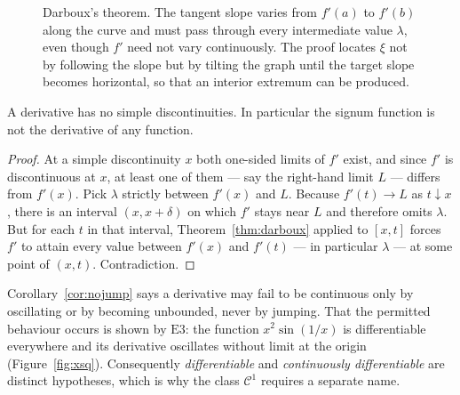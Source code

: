\begin{figure}[htbp]
\centering
{}
\caption{Darboux's theorem. The tangent slope varies from $f'(a)$ to $f'(b)$
along the curve and must pass through every intermediate value $\lambda$,
even though $f'$ need not vary continuously. The proof locates $\xi$ not by
following the slope but by tilting the graph until the target slope becomes
horizontal, so that an interior extremum can be produced.}
\label{fig:darboux}
\end{figure}

\begin{corollary}\label{cor:nojump}
A derivative has no simple discontinuities. In particular the signum function
is not the derivative of any function.
\end{corollary}

\begin{proof}
At a simple discontinuity $x$ both one-sided limits of $f'$ exist, and
since $f'$ is discontinuous at $x$, at least one of them --- say the
right-hand limit $L$ --- differs from $f'(x)$. Pick $\lambda$ strictly
between $f'(x)$ and $L$. Because $f'(t) \to L$ as $t \downarrow x$, there
is an interval $(x, x+\delta)$ on which $f'$ stays near $L$ and therefore
omits $\lambda$. But for each $t$ in that interval,
Theorem~\ref{thm:darboux} applied to $[x,t]$ forces $f'$ to attain every
value between $f'(x)$ and $f'(t)$ --- in particular $\lambda$ --- at some
point of $(x,t)$. Contradiction.
\end{proof}

Corollary~\ref{cor:nojump} says a derivative may fail to be continuous only
by oscillating or by becoming unbounded, never by jumping. That the permitted
behaviour occurs is shown by $\mathrm{E}3$: the function $x^2\sin(1/x)$ is
differentiable everywhere and its derivative oscillates without limit at the
origin (Figure~\ref{fig:xsq}). Consequently \emph{differentiable} and \emph{continuously
differentiable} are distinct hypotheses, which is why the class
$\mathscr{C}^1$ requires a separate name.

